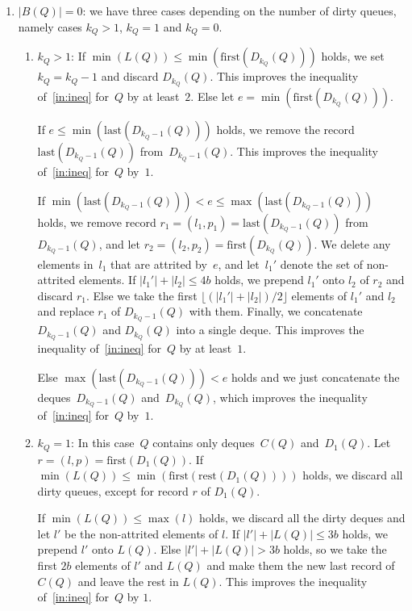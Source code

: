 \documentclass{sig-alternate}
\newcommand{\first}{\text{first}}
\newcommand{\last}{\text{last}}
\newcommand{\rest}{\text{rest}}
\newcommand{\iref}[1]{\ref{#1}} \newcommand{\attr}[1]{\widetilde{#1}}
\renewcommand{\(}{\left(}
\renewcommand{\)}{\right)}
\begin{document}
\begin{enumerate}
  \item \label{it:Beq0} $|B(Q)| = 0$: we have three cases depending on the
    number of dirty queues, namely cases $k_Q > 1$, $k_Q = 1$ and $k_Q = 0$.
    \begin{enumerate}[label=\arabic*)]
      \item \label{it:KQgt1} $k_Q > 1$: If $\min(L(Q)) \leq
        \min(\first(D_{k_Q}(Q)))$ holds, we set $k_Q = k_Q-1$ and discard
        $D_{k_Q}(Q)$. This improves the inequality of~\iref{in:ineq} for~$Q$
        by at least~$2$. Else let $e = \min(\first(D_{k_Q}(Q)))$.

        If $e \leq \min(\last(D_{k_Q-1}(Q)))$ holds, we remove the record
        $\last(D_{k_Q -1}(Q))$ from~$D_{k_Q-1}(Q)$. This improves the inequality
        of~\iref{in:ineq} for~$Q$ by~$1$.

      If $\min(\last(D_{k_Q-1}(Q))) < e \leq \max(\last(D_{k_Q-1}(Q)))$ holds,
      we remove record $r_1 = (l_1,p_1) = \last(D_{k_Q-1}(Q))$
      from~$D_{k_Q-1}(Q)$, and let $r_2 = (l_2,p_2) = \first(D_{k_Q}(Q))$. We
      delete any elements in~$l_1$ that are attrited by~$e$, and let~$l_1'$
      denote the set of non-attrited elements. If $|l_1'| + |l_2| \leq 4b$
      holds, we prepend $l_1'$ onto $l_2$ of $r_2$ and discard $r_1$. Else
      we take the first $\lfloor (|l_1'| + |l_2|) / 2 \rfloor$ elements of
      $l_1'$ and $l_2$ and replace $r_1$ of $D_{k_Q-1}(Q)$ with them. Finally,
      we concatenate $D_{k_Q-1}(Q)$ and $D_{k_Q}(Q)$ into a single deque. This
      improves the inequality of~\iref{in:ineq} for~$Q$ by at least~$1$.

    Else $\max(\last(D_{k_Q-1}(Q))) < e$ holds and we just concatenate the
    deques~$D_{k_Q-1}(Q)$ and~$D_{k_Q} (Q)$, which improves the inequality
    of~\iref{in:ineq} for~$Q$ by~$1$.

  \item \label{it:KQeq1} $k_Q = 1$: In this case~$Q$ contains only
    deques~$C(Q)$ and~$D_1(Q)$. Let $r = (l,p) = \first(D_1(Q))$. If
    $\min(L(Q)) \leq \min(\first(\rest(D_1(Q))))$ holds, we discard
    all dirty queues, except for record $r$ of $D_1(Q)$.

    If $\min(L(Q)) \leq \max(l)$ holds, we discard all the dirty deques and let
    $l'$ be the non-attrited elements of $l$. If $|l'| + |L(Q)| \leq 3b$ holds,
    we prepend $l'$ onto $L(Q)$. Else $|l'| + |L(Q)| > 3b$ holds, so we take the
    first $2b$ elements of $l'$ and $L(Q)$ and make them the new last record of
    $C(Q)$ and leave the rest in $L(Q)$. This improves the inequality
    of~\iref{in:ineq} for~$Q$ by $1$.


\end{enumerate}
\end{enumerate}
\end{document}

